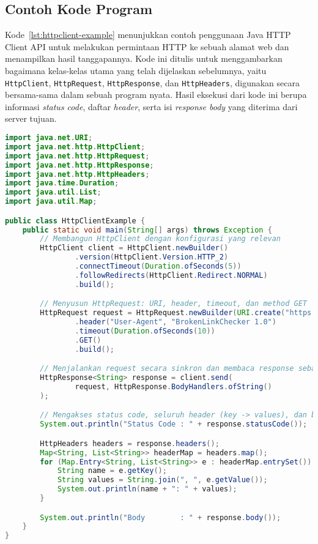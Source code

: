 \subsection{Contoh Kode Program}
\label{subsec:0228-contoh-kode-program}

Kode~\ref{lst:httpclient-example} menunjukkan contoh penggunaan Java HTTP Client API untuk melakukan permintaan HTTP ke sebuah alamat web dan menampilkan hasil tanggapannya. Kode ini ditulis untuk menggambarkan bagaimana kelas-kelas utama yang telah dijelaskan sebelumnya, yaitu \texttt{HttpClient}, \texttt{HttpRequest}, \texttt{HttpResponse}, dan \texttt{HttpHeaders}, digunakan secara bersama-sama dalam sebuah program nyata. Hasil eksekusi dari kode ini berupa informasi \textit{status code}, daftar \textit{header}, serta isi \textit{response body} yang diterima dari server tujuan.

\begin{lstlisting}[language=Java, caption={Contoh penggunaan Java HTTP Client API}, label={lst:httpclient-example}]
import java.net.URI;
import java.net.http.HttpClient;
import java.net.http.HttpRequest;
import java.net.http.HttpResponse;
import java.net.http.HttpHeaders;
import java.time.Duration;
import java.util.List;
import java.util.Map;

public class HttpClientExample {
    public static void main(String[] args) throws Exception {
        // Membangun HttpClient dengan konfigurasi yang relevan
        HttpClient client = HttpClient.newBuilder()
                .version(HttpClient.Version.HTTP_2)
                .connectTimeout(Duration.ofSeconds(5))
                .followRedirects(HttpClient.Redirect.NORMAL)
                .build();

        // Menyusun HttpRequest: URI, header, timeout, dan method GET
        HttpRequest request = HttpRequest.newBuilder(URI.create("https://informatika.unpar.ac.id"))
                .header("User-Agent", "BrokenLinkChecker 1.0")
                .timeout(Duration.ofSeconds(10))
                .GET()
                .build();

        // Menjalankan request secara sinkron dan membaca response sebagai String
        HttpResponse<String> response = client.send(
                request, HttpResponse.BodyHandlers.ofString()
        );

        // Mengakses status code, seluruh header (key -> values), dan body response
        System.out.println("Status Code : " + response.statusCode());

        HttpHeaders headers = response.headers();
        Map<String, List<String>> headerMap = headers.map();
        for (Map.Entry<String, List<String>> e : headerMap.entrySet()) {
            String name = e.getKey();
            String values = String.join(", ", e.getValue());
            System.out.println(name + ": " + values);
        }

        System.out.println("Body        : " + response.body());
    }
}
\end{lstlisting}

